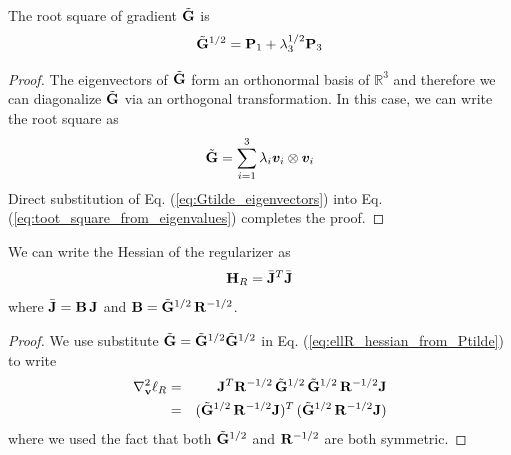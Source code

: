 
\begin{theorem}
The root square of gradient $\tilde{{\mathbf{G}}}$ is 
\begin{equation}
	\tilde{{\mathbf{G}}}^{1/2} = {\mathbf{P}}_1 + \lambda_3^{1/2}{\mathbf{P}}_3
\end{equation}
\end{theorem}
\begin{proof}
The eigenvectors of $\tilde{{\mathbf{G}}}$ form an orthonormal basis of $\mathbb{R}^3$ and therefore we can diagonalize $\tilde{{\mathbf{G}}}$ via an orthogonal transformation. In this case, we can write the root square as
\begin{equation}
	\sGtilde = \sum_{i=1}^{3} \lambda_i\vf{v}_i\otimes\vf{v}_i
	\label{eq:toot_square_from_eigenvalues}
\end{equation}
Direct substitution of Eq. (\ref{eq:Gtilde_eigenvectors}) into Eq. (\ref{eq:toot_square_from_eigenvalues}) completes the proof.
\end{proof}




\begin{theorem}
We can write the Hessian of the regularizer as
\begin{equation}
	{\mathbf{H}}_R=\bar{{\mathbf{J}}}^T\bar{{\mathbf{J}}}
\end{equation}
where $\bar{{\mathbf{J}}}={\mathbf{B}}\,{\mathbf{J}}$ and ${\mathbf{B}} = \tilde{{\mathbf{G}}}^{1/2}\,{\mathbf{R}}^{-1/2}$.
\end{theorem} 
\begin{proof}
We use substitute $\tilde{{\mathbf{G}}}=\tilde{{\mathbf{G}}}^{1/2}\tilde{{\mathbf{G}}}^{1/2}$ in Eq. (\ref{eq:ellR_hessian_from_Ptilde}) to write
\begin{eqnarray}
	\nabla_{\mathbf{v}}^2\ell_R
	&=& {\mathbf{J}}^T{\mathbf{R}}^{-1/2}\,\tilde{{\mathbf{G}}}^{1/2}\,\tilde{{\mathbf{G}}}^{1/2}\,{\mathbf{R}}^{-1/2}{\mathbf{J}}\nonumber\\
	&=& (\tilde{{\mathbf{G}}}^{1/2}\,{\mathbf{R}}^{-1/2}{\mathbf{J}})^T\,(\tilde{{\mathbf{G}}}^{1/2}\,{\mathbf{R}}^{-1/2}{\mathbf{J}})
\end{eqnarray}
where we used the fact that both $\tilde{{\mathbf{G}}}^{1/2}$ and ${\mathbf{R}}^{-1/2}$ are both symmetric.
\end{proof}

